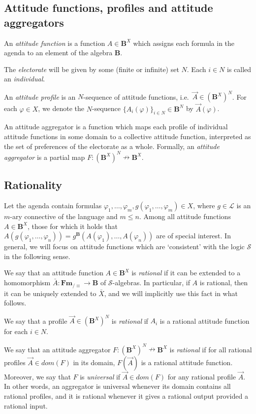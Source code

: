 \documentclass{llncs}
\numberwithin{equation}{section}
\newcommand{\Sm}{\mathcal{S}}   \newcommand{\Lm}{\mathcal{L}}  \newcommand{\Fm}{\mathbf{Fm}}  \newcommand{\Hom}{\mathrm{Hom}}   \newcommand{\Al}{\mathbf{A}}  \newcommand{\BB}{\mathbf{B}}   \newcommand{\Alg}{\mathbb{A}\mathrm{lg}}
\newcommand{\SSS}{\mathcal{S}}
\begin{document}
\subsection{Attitude functions, profiles and attitude aggregators}

An \emph{attitude function} is a function ${A\in \BB^{X}}$ which assigns each formula in the agenda to an element of the algebra $\BB$.

The \emph{electorate} will be given by some (finite or infinite) set $N$. Each $i\in N$ is called an \emph{individual}.

An \emph{attitude profile} is an $N$-sequence of attitude functions, i.e.\ $\vec{A}\in (\BB^{X})^{N}$.
For each $\varphi\in X$, we denote the $N$-sequence $\{A_{i}(\varphi)\}_{i\in N}\in \BB^{N}$ by $\vec{A}(\varphi)$.

An attitude aggregator is a function which maps each profile of individual attitude functions in some domain to a collective attitude function, interpreted as the set of preferences of the electorate as a whole.
Formally, an \emph{attitude aggregator} is a partial map $F:(\BB^{X})^{N} \nrightarrow \BB^{X}$.

\subsection{Rationality}
Let the agenda contain formulas $\varphi_{1},\dots,\varphi_{m},g(\varphi_{1},\dots,\varphi_{m})\in X$, where $g\in\Lm$ is an $m$-ary connective of the language and $m\leq n$.
Among all attitude functions $A\in\BB^{X}$, those for which it holds that $A(g(\varphi_{1},\dots,\varphi_{n}))=g^{\BB}(A(\varphi_{1}),\dots,A(\varphi_{n}))$ are of special interest. In general, we will focus on attitude functions which are `consistent' with the logic $\Sm$ in the following sense.

We say that an attitude function $A\in \BB^{X}$ is \emph{rational} if it can be extended to a homomorphism $\bar{A}:\Fm_{/\equiv}\longrightarrow \BB$ of $\SSS$-algebras. In particular, if $A$ is rational, then it can be uniquely extended to $\bar{X}$, and we will implicitly use this fact in what follows.

We say that a profile $\vec{A}\in (\BB^{X})^{N}$ is \emph{rational} if $A_{i}$ is a rational attitude function for each $i\in N$.

We say that an attitude aggregator $F:(\BB^{X})^{N} \nrightarrow \BB^{X}$ is \emph{rational} if for all rational profiles $\vec{A}\in dom(F)$ in its domain, $F(\vec{A})$ is a rational attitude function. Moreover, we say that $F$ is \emph{universal} if $\vec{A}\in dom(F)$ for any rational profile $\vec{A}$. In other words, an aggregator is universal whenever its domain contains all rational profiles, and it is rational whenever it gives a rational output provided a rational input.
\end{document}
